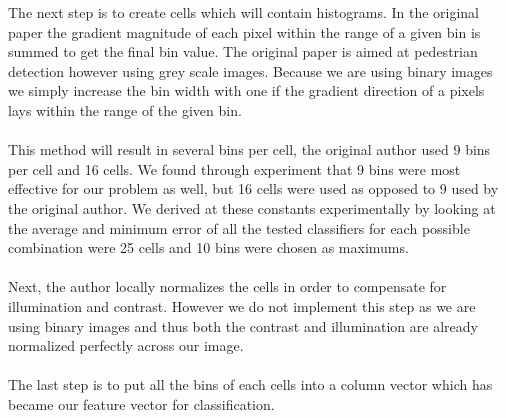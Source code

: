\documentclass[%
        compressed,
        final,
        notitlepage,
        narroweqnarray,
        inline,
        twoside,
        ]{ieee}
\begin{document}
The next step is to create cells which will contain histograms. In the original
paper the gradient magnitude of each pixel within the range of a given bin is
summed to get the final bin value. The original paper is aimed at pedestrian
detection however using grey scale images. Because we are using binary images we
simply increase the bin width with one if the gradient direction of a pixels lays within the range of the given bin.\\\\
This method will result in several bins per cell, the original author used 9
bins per cell and 16 cells. We found through experiment that 9 bins were most effective for
our problem as well, but 16 cells were used as opposed to 9 used by the original author.
We derived at these constants experimentally by looking at the average and
minimum error of all the tested classifiers for each possible combination were
25 cells and 10 bins were chosen as maximums. \\\\

Next, the author locally normalizes the cells in order to compensate for illumination and contrast. However we do not implement this step as we are using binary images and thus both the contrast and illumination are already normalized perfectly across our image.\\\\
The last step is to put all the bins of each cells into a column vector which has became our feature vector for classification.
\end{document}
